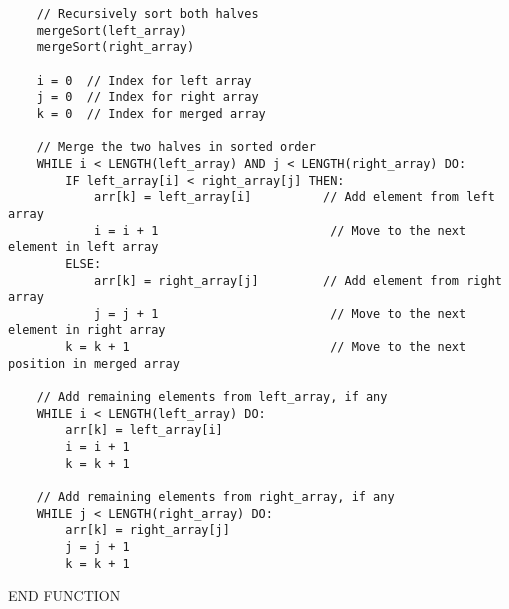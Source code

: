 \documentclass[11pt]{article}
\begin{document}
\begin{verbatim}
    // Recursively sort both halves
    mergeSort(left_array)
    mergeSort(right_array)

    i = 0  // Index for left array
    j = 0  // Index for right array
    k = 0  // Index for merged array

    // Merge the two halves in sorted order
    WHILE i < LENGTH(left_array) AND j < LENGTH(right_array) DO:
        IF left_array[i] < right_array[j] THEN:
            arr[k] = left_array[i]          // Add element from left array
            i = i + 1                        // Move to the next element in left array
        ELSE:
            arr[k] = right_array[j]         // Add element from right array
            j = j + 1                        // Move to the next element in right array
        k = k + 1                            // Move to the next position in merged array

    // Add remaining elements from left_array, if any
    WHILE i < LENGTH(left_array) DO:
        arr[k] = left_array[i]
        i = i + 1
        k = k + 1

    // Add remaining elements from right_array, if any
    WHILE j < LENGTH(right_array) DO:
        arr[k] = right_array[j]
        j = j + 1
        k = k + 1
\end{verbatim}

END FUNCTION
\end{document}
